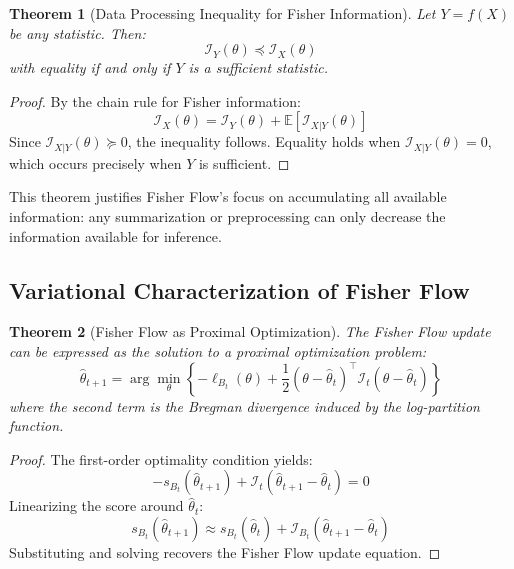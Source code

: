 \documentclass[11pt]{article}
\newtheorem{theorem}{Theorem}
\begin{document}
\begin{theorem}[Data Processing Inequality for Fisher Information]
\label{thm:data_processing}
Let $Y = f(X)$ be any statistic. Then:
\begin{equation}
\mathcal{I}_Y(\theta) \preceq \mathcal{I}_X(\theta)
\end{equation}
with equality if and only if $Y$ is a sufficient statistic.
\end{theorem}

\begin{proof}
By the chain rule for Fisher information:
\begin{equation}
\mathcal{I}_X(\theta) = \mathcal{I}_Y(\theta) + \mathbb{E}[\mathcal{I}_{X|Y}(\theta)]
\end{equation}
Since $\mathcal{I}_{X|Y}(\theta) \succeq 0$, the inequality follows. Equality holds when $\mathcal{I}_{X|Y}(\theta) = 0$, which occurs precisely when $Y$ is sufficient.
\end{proof}

This theorem justifies Fisher Flow's focus on accumulating all available information: any summarization or preprocessing can only decrease the information available for inference.

\subsection{Variational Characterization of Fisher Flow}

\begin{theorem}[Fisher Flow as Proximal Optimization]
\label{thm:proximal}
The Fisher Flow update can be expressed as the solution to a proximal optimization problem:
\begin{equation}
\hat{\theta}_{t+1} = \arg\min_{\theta} \left\{-\ell_{B_t}(\theta) + \frac{1}{2}(\theta - \hat{\theta}_t)^\top \mathcal{I}_t (\theta - \hat{\theta}_t)\right\}
\end{equation}
where the second term is the Bregman divergence induced by the log-partition function.
\end{theorem}

\begin{proof}
The first-order optimality condition yields:
\begin{equation}
-s_{B_t}(\hat{\theta}_{t+1}) + \mathcal{I}_t(\hat{\theta}_{t+1} - \hat{\theta}_t) = 0
\end{equation}
Linearizing the score around $\hat{\theta}_t$:
\begin{equation}
s_{B_t}(\hat{\theta}_{t+1}) \approx s_{B_t}(\hat{\theta}_t) + \mathcal{I}_{B_t}(\hat{\theta}_{t+1} - \hat{\theta}_t)
\end{equation}
Substituting and solving recovers the Fisher Flow update equation.
\end{proof}
\end{document}

